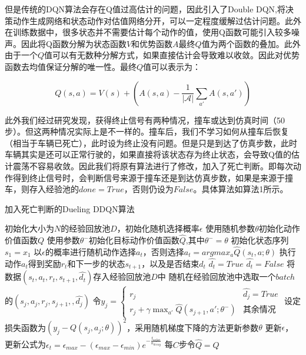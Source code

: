 \documentclass[letterpaper, 10 pt, conference]{ieeeconf}  %
\begin{document}
但是传统的DQN算法会存在Q值过高估计的问题，因此引入了Double DQN,将决策动作生成网络和状态动作对估值网络分开，可以一定程度缓解过估计问题。此外在训练数据中，很多状态并不需要估计每个动作的值，使用Q函数可能引入较多噪声。因此将Q函数分解为状态函数$V$和优势函数$A$最终$Q$值为两个函数的叠加。此外由于一个$Q$值可以有无数种分解方式，如果直接估计会导致难以收敛。因此对优势函数去均值保证分解的唯一性。最终$Q$值可以表示为：

\begin{equation}
    Q(s,a) = V(s)+(A(s,a)-\frac{1}{|\mathcal{A}|}\sum_{a'}A(s,a'))    
\end{equation}



此外我们经过研究发现，获得终止信号有两种情况，撞车或达到仿真时间（50步）。但这两种情况实际上是不一样的。撞车后，我们不学习如何从撞车后恢复（相当于车辆已死亡），此时设为终止没有问题。但是只是到达了仿真步数，此时车辆其实是还可以正常行驶的，如果直接将该状态存为终止状态，会导致Q值的估计震荡不容易收敛。因此我们将原有算法进行了修改，加入了死亡判断。即每次动作得到终止信号时，会判断信号来源于撞车还是到达仿真步数，如果是来源于撞车，则存入经验池的$done=True$，否则仍设为$False$。具体算法如算法1所示。


\begin{algorithm}[htbp]  
    \caption{加入死亡判断的Dueling DDQN算法}  
    \begin{algorithmic}[1] %
            \State 初始化大小为$N$的经验回放池$D$，初始化随机选择概率$\epsilon$
            \State 使用随机参数$\theta$初始化动作价值函数$Q$
            \State 使用参数$\theta^-$初始化目标动作价值函数$\hat{Q}$,其中$\theta^- = \theta$
                \State 初始化状态序列$s_1={x_1}$
                    \State 以$\epsilon$的概率进行随机动作选择$a_t$，否则选择$a_t = argmax_a \hat{Q}(s_t,a;\theta) $
                    \State 执行动作$a_t$得到奖励$r_t$和下一步的状态$s_{t+1}$，以及是否结束$d_t$
                        \State $\hat{d_t}=True$
                    \Else
                        \State $\hat{d_t}=False$
                    \EndIf
                    \State 将数据$(s_t,a_t,r_t,s_{t+1},\hat{d_t})$存入经验回放池$D$中
                    \State 随机在经验回放池中选取一个$batch$的$(s_j,a_j,r_j,s_{j+1},,\hat{d_j})$
                    \State 令$y_j = 
                    \begin{cases}
                        r_j      &  \hat{d_j}=True \\
                        r_j+\gamma \max_{a'} \hat{Q}(s_{j+1},a';\theta^-)   & \mbox{其余情况}
                      \end{cases}
                    $
                    \State 设定损失函数为$(y_j-Q(s_j,a_j;\theta))^2$，采用随机梯度下降的方法更新参数$\theta$
                    \State 更新$\epsilon$，更新公式为$\epsilon_t =\epsilon_{max} - (\epsilon_{max}-\epsilon_{min})e^{-\frac{t_{sofar}}{n_{decay}}}$
                    \State 每$C$步令$\hat{Q} = Q$
                \EndFor
            \EndFor
    \end{algorithmic}  
\end{algorithm} 
\end{document}
